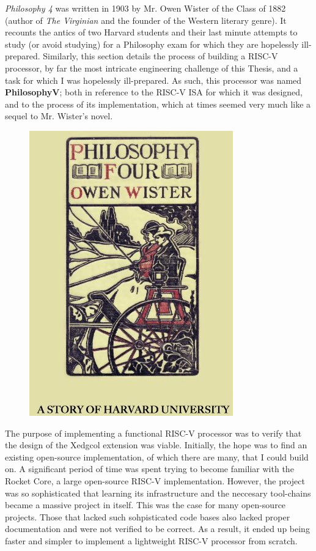 
\textit{Philosophy 4} was written in 1903 by Mr. Owen Wister of the Class of 1882 (author of \textit{The Virginian} and the founder of the Western literary genre). It recounts the antics of two Harvard students and their last minute attempts to study (or avoid studying) for a Philosophy exam for which they are hopelessly ill-prepared. Similarly, this section details the process of building a RISC-V processor, by far the most intricate engineering challenge of this Thesis, and a task for which I was hopelessly ill-prepared. As such, this processor was named \textbf{PhilosophyV}; both in reference to the RISC-V ISA for which it was designed, and to the process of its implementation, which at times seemed very much like a sequel to Mr. Wister's novel. \\

\begin{figure}[H]
\begin{center}
\includegraphics[width=0.55\linewidth]{chapters/chapter4/img/phil4.jpg}
\end{center}
\end{figure}

The purpose of implementing a functional RISC-V processor was to verify that the design of the Xedgcol extension was viable. Initially, the hope was to find an existing open-source implementation, of which there are many, that I could build on. A significant period of time was spent trying to become familiar with the Rocket Core\cite{ChipsAlliance2020}, a large open-source RISC-V implementation. However, the project was so sophisticated that learning its infrastructure and the neccesary tool-chains became a massive project in itself. This was the case for many open-source projects. Those that lacked such sohpisticated code bases also lacked proper documentation and were not verified to be correct. As a result, it ended up being faster and simpler to implement a lightweight RISC-V processor from scratch. 

